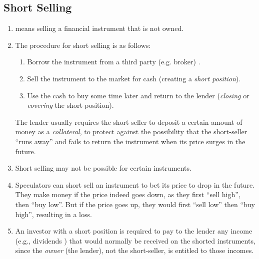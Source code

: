 \subsection{Short Selling}
\begin{enumerate}
\item {} means selling a financial instrument 
that is not owned.
\item The procedure for short selling is as follows:
\begin{enumerate}
\item Borrow the instrument  from a third party (e.g. broker) .
\item Sell the instrument  to the market 
for cash  (creating a \emph{short position}).
\item Use the cash  to buy  some time later
 and return  to the lender 
(\emph{closing} or \emph{covering} the short position).
\end{enumerate}
\begin{note}
The lender  usually requires the short-seller to deposit a
certain amount of money as a \emph{collateral}, to protect against the
possibility that the short-seller ``runs away''  and fails to
return the instrument  when its price surges in the future.
\end{note}

\item Short selling may not be possible for certain instruments.

\item Speculators can short sell an instrument  to
bet  its price to drop {\color{red}} in the
future. They make money if the price indeed goes down, as they first ``sell
high'', then ``buy low''. But if the price goes up, they would first ``sell
low'' then ``buy high'', resulting in a loss.

\item An investor with a short position is required to pay to the lender
 any income (e.g., dividends ) that
would normally be received on the shorted instruments, since the \emph{owner}
(the lender), not the short-seller, is entitled to those incomes.
\end{enumerate}
